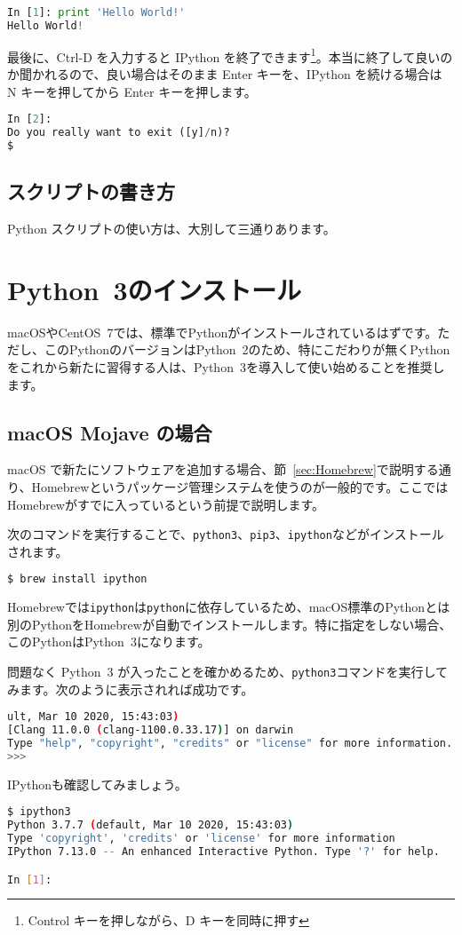 \begin{lstlisting}[language=python]
In [1]: print 'Hello World!'
Hello World!
\end{lstlisting}

最後に、Ctrl-D を入力すると IPython を終了できます\footnote{Control キーを押しながら、D キーを同時に押す}。本当に終了して良いのか聞かれるので、良い場合はそのまま Enter キーを、IPython を続ける場合は N キーを押してから Enter キーを押します。

\begin{lstlisting}[language=python]
In [2]:
Do you really want to exit ([y]/n)? 
$ 
\end{lstlisting}

\subsection{スクリプトの書き方}

Python スクリプトの使い方は、大別して三通りあります。

\section{Python~3のインストール}
\label{sec:Python_Install}

macOSやCentOS~7では、標準でPythonがインストールされているはずです。ただし、このPythonのバージョンはPython~2のため、特にこだわりが無くPythonをこれから新たに習得する人は、Python~3を導入して使い始めることを推奨します。

\subsection{macOS Mojave の場合}

macOS で新たにソフトウェアを追加する場合、節~\ref{sec:Homebrew}で説明する通り、Homebrewというパッケージ管理システムを使うのが一般的です。ここではHomebrewがすでに入っているという前提で説明します。

次のコマンドを実行することで、\texttt{python3}、\texttt{pip3}、\texttt{ipython}などがインストールされます。
\begin{lstlisting}[language=bash]
$ brew install ipython
\end{lstlisting}
Homebrewでは\texttt{ipython}は\texttt{python}に依存しているため、macOS標準のPythonとは別のPythonをHomebrewが自動でインストールします。特に指定をしない場合、このPythonはPython~3になります。

問題なく Python~3 が入ったことを確かめるため、\texttt{python3}コマンドを実行してみます。次のように表示されれば成功です。
\begin{lstlisting}[language=bash]
ult, Mar 10 2020, 15:43:03) 
[Clang 11.0.0 (clang-1100.0.33.17)] on darwin
Type "help", "copyright", "credits" or "license" for more information.
>>> 
\end{lstlisting}
IPythonも確認してみましょう。
\begin{lstlisting}[language=bash]
$ ipython3
Python 3.7.7 (default, Mar 10 2020, 15:43:03)
Type 'copyright', 'credits' or 'license' for more information
IPython 7.13.0 -- An enhanced Interactive Python. Type '?' for help.

In [1]:
\end{lstlisting}

